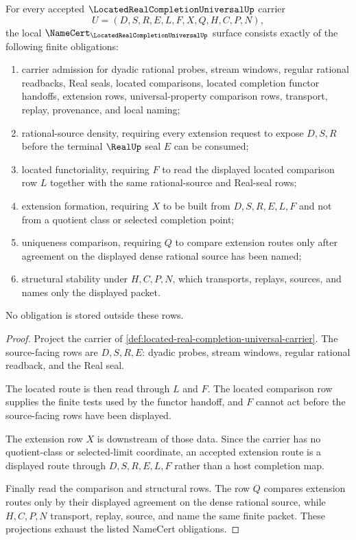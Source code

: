 \begin{theorem}
\label{thm:located-real-completion-universal-namecert-obligations}
For every accepted $\LocatedRealCompletionUniversalUp$ carrier
$$
U=(D,S,R,E,L,F,X,Q,H,C,P,N),
$$
the local $\NameCert_{\LocatedRealCompletionUniversalUp}$ surface consists exactly of the following finite obligations:
\begin{enumerate}
\item carrier admission for dyadic rational probes, stream windows, regular rational readbacks, Real seals, located comparisons, located completion functor handoffs, extension rows, universal-property comparison rows, transport, replay, provenance, and local naming;
\item rational-source density, requiring every extension request to expose $D,S,R$ before the terminal $\RealUp$ seal $E$ can be consumed;
\item located functoriality, requiring $F$ to read the displayed located comparison row $L$ together with the same rational-source and Real-seal rows;
\item extension formation, requiring $X$ to be built from $D,S,R,E,L,F$ and not from a quotient class or selected completion point;
\item uniqueness comparison, requiring $Q$ to compare extension routes only after agreement on the displayed dense rational source has been named;
\item structural stability under $H,C,P,N$, which transports, replays, sources, and names only the displayed packet.
\end{enumerate}
No obligation is stored outside these rows.
\end{theorem}
\begin{proof}
Project the carrier of \autoref{def:located-real-completion-universal-carrier}. The source-facing rows are $D,S,R,E$: dyadic probes, stream windows, regular rational readback, and the Real seal.

The located route is then read through $L$ and $F$. The located comparison row supplies the finite tests used by the functor handoff, and $F$ cannot act before the source-facing rows have been displayed.

The extension row $X$ is downstream of those data. Since the carrier has no quotient-class or selected-limit coordinate, an accepted extension route is a displayed route through $D,S,R,E,L,F$ rather than a host completion map.

Finally read the comparison and structural rows. The row $Q$ compares extension routes only by their displayed agreement on the dense rational source, while $H,C,P,N$ transport, replay, source, and name the same finite packet. These projections exhaust the listed NameCert obligations.
\end{proof}

